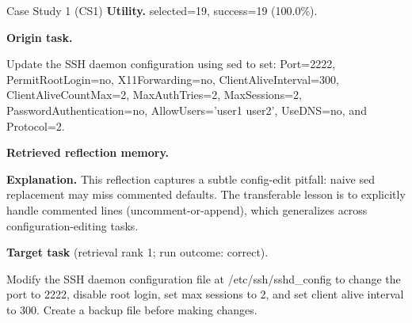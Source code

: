 \documentclass{article}
\theoremstyle{plain}
\theoremstyle{definition}
\theoremstyle{remark}
\begin{document}
\begin{CaseBox}{Case Study 1 (CS1)}
\textbf{Utility.} selected=19, success=19 (100.0\%).
\par\medskip
\textbf{Origin task.}
\begin{CodeBox}
Update the SSH daemon configuration using sed to set: Port=2222, PermitRootLogin=no, X11Forwarding=no, ClientAliveInterval=300, ClientAliveCountMax=2, MaxAuthTries=2, MaxSessions=2, PasswordAuthentication=no, AllowUsers='user1 user2', UseDNS=no, and Protocol=2.
\end{CodeBox}
\medskip
\textbf{Retrieved reflection memory.}
\par\medskip
\textbf{Explanation.} This reflection captures a subtle config-edit pitfall: naive sed replacement may miss commented defaults. The transferable lesson is to explicitly handle commented lines (uncomment-or-append), which generalizes across configuration-editing tasks.
\par\medskip
\textbf{Target task} (retrieval rank 1; run outcome: correct).
\begin{CodeBox}
Modify the SSH daemon configuration file at /etc/ssh/sshd_config to change the port to 2222, disable root login, set max sessions to 2, and set client alive interval to 300. Create a backup file before making changes.
\end{CodeBox}
\end{CaseBox}
\medskip
\end{document}

